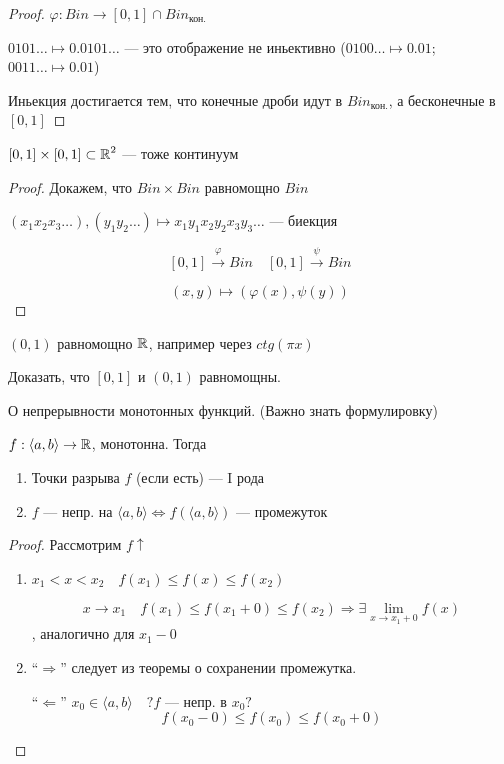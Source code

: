     \begin{proof}
        $\varphi : Bin\to [0,1]\cap Bin_{\text{кон.}}$

        $0101\ldots\mapsto0.0101\ldots$ --- это отображение не иньективно ($0100\ldots\mapsto0.01$; $0011\ldots\mapsto0.01$)

        Иньекция достигается тем, что конечные дроби идут в $Bin_{\text{кон.}}$, а бесконечные в $[0,1]$
    \end{proof}
    \begin{consequence}
        $[0,1]\times[0,1]\subset\operatorname*{\mathbb{R}}^2$ --- тоже континуум
    \end{consequence}
    \begin{proof}
        Докажем, что $Bin\times Bin$ равномощно $Bin$

        $(x_1x_2x_3\ldots), (y_1y_2\ldots)\mapsto x_1y_1x_2y_2x_3y_3\ldots$ --- биекция

        $$[0,1]\xrightarrow{\varphi} Bin \quad [0,1]\xrightarrow \psi Bin$$

        $$(x,y)\mapsto (\varphi(x), \psi(y))$$
    \end{proof}
    \begin{remark}
        $(0,1)$ равномощно $\operatorname*{\mathbb{R}}$, например через $ctg(\pi x)$
    \end{remark}

    \begin{exercise}
        Доказать, что $[0,1]$ и $(0,1)$ равномощны.
    \end{exercise}

    \begin{theorem}
        О непрерывности монотонных функций. (Важно знать формулировку)

        $f:\langle a,b\rangle \to\operatorname*{\mathbb{R}}$, монотонна. Тогда
        \begin{enumerate}
            \item Точки разрыва $f$ (если есть) --- I рода
            \item $f$ --- непр. на $\langle a,b\rangle \Leftrightarrow f(\langle a,b\rangle)$ --- промежуток
        \end{enumerate}
    \end{theorem}
    \begin{proof}
        Рассмотрим $f\uparrow$
        \begin{enumerate}
            \item $x_1<x<x_2 \quad f(x_1)\leq f(x)\leq f(x_2)$
            
            $$x\to x_1 \quad f(x_1)\leq f(x_1+0)\leq f(x_2) \Rightarrow \exists\lim\limits_{x\to x_1+0} f(x)$$, аналогично для $x_1-0$
            
            \item ``$\Rightarrow$'' следует из теоремы о сохранении промежутка.
            
            ``$\Leftarrow$'' $x_0\in\langle a,b\rangle \quad ?f$ --- непр. в $x_0?$
            $$f(x_0-0)\leq f(x_0)\leq f(x_0+0)$$
        \end{enumerate}
    \end{proof}
